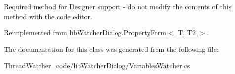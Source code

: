 Required method for Designer support -\/ do not modify the contents of this method with the code editor. 



Reimplemented from \hyperlink{classlib_watcher_dialog_1_1_property_form_3_01_t_00_01_t2_01_4_a46d9bc03593bef5fdd6dd2d19fc4c8bd}{lib\+Watcher\+Dialog.\+Property\+Form$<$ T, T2 $>$}.



The documentation for this class was generated from the following file\+:\begin{DoxyCompactItemize}
\item 
Thread\+Watcher\+\_\+code/lib\+Watcher\+Dialog/Variables\+Watcher.\+cs\end{DoxyCompactItemize}
